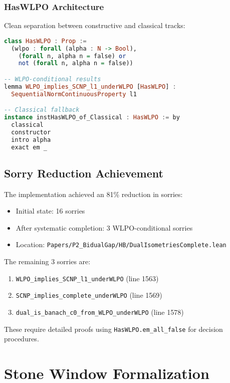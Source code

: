 \documentclass{lmcs}
\begin{document}
\subsubsection{HasWLPO Architecture}

Clean separation between constructive and classical tracks:

\begin{lstlisting}[language=Haskell, caption={HasWLPO typeclass design}]
class HasWLPO : Prop :=
  (wlpo : forall (alpha : N -> Bool), 
    (forall n, alpha n = false) or 
    not (forall n, alpha n = false))

-- WLPO-conditional results
lemma WLPO_implies_SCNP_l1_underWLPO [HasWLPO] : 
  SequentialNormContinuousProperty l1

-- Classical fallback
instance instHasWLPO_of_Classical : HasWLPO := by
  classical
  constructor
  intro alpha
  exact em _
\end{lstlisting}

\subsection{Sorry Reduction Achievement}

The implementation achieved an 81\% reduction in sorries:
\begin{itemize}
\item Initial state: 16 sorries
\item After systematic completion: 3 WLPO-conditional sorries
\item Location: \texttt{Papers/P2\_BidualGap/HB/DualIsometriesComplete.lean}
\end{itemize}

The remaining 3 sorries are:
\begin{enumerate}
\item \texttt{WLPO\_implies\_SCNP\_l1\_underWLPO} (line 1563)
\item \texttt{SCNP\_implies\_complete\_underWLPO} (line 1569)
\item \texttt{dual\_is\_banach\_c0\_from\_WLPO\_underWLPO} (line 1578)
\end{enumerate}

These require detailed proofs using \texttt{HasWLPO.em\_all\_false} for decision procedures.

\section{Stone Window Formalization}\label{sec:stone}
\end{document}
